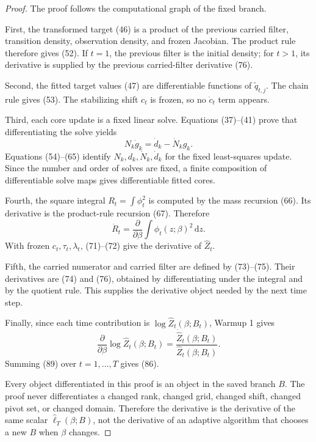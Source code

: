 \documentclass[11pt]{article}
\theoremstyle{remark}
\newcommand{\dd}{\,\mathrm d}
\newcommand{\widehatell}{\widehat\ell}
\begin{document}
\begin{proof}
The proof follows the computational graph of the fixed branch.

First, the transformed target (46) is a product of the previous carried filter,
transition density, observation density, and frozen Jacobian.  The product rule
therefore gives (52).  If \(t=1\), the previous filter is the initial density;
for \(t>1\), its derivative is supplied by the previous carried-filter
derivative (76).

Second, the fitted target values (47) are differentiable functions of
\(\widetilde q_{t,j}\).  The chain rule gives (53).  The stabilizing shift
\(c_t\) is frozen, so no \(\dot c_t\) term appears.

Third, each core update is a fixed linear solve.  Equations (37)--(41) prove
that differentiating the solve yields
\[
    N_k\dot g_k=\dot d_k-\dot N_k g_k.
    \tag{87}
\]
Equations (54)--(65) identify \(N_k,d_k,\dot N_k,\dot d_k\) for the fixed
least-squares update.  Since the number and order of solves are fixed, a finite
composition of differentiable solve maps gives differentiable fitted cores.

Fourth, the square integral \(R_t=\int\phi_t^2\) is computed by the mass
recursion (66).  Its derivative is the product-rule recursion (67).  Therefore
\[
    \dot R_t=\frac{\partial}{\partial\beta}
    \int\phi_t(z;\beta)^2\dd z.
    \tag{88}
\]
With frozen \(c_t,\tau_t,\lambda_t\), (71)--(72) give the derivative of
\(\widehat Z_t\).

Fifth, the carried numerator and carried filter are defined by (73)--(75).
Their derivatives are (74) and (76), obtained by differentiating under the
integral and by the quotient rule.  This supplies the derivative object needed
by the next time step.

Finally, since each time contribution is \(\log\widehat Z_t(\beta;B_t)\),
Warmup 1 gives
\[
    \frac{\partial}{\partial\beta}
    \log\widehat Z_t(\beta;B_t)
    =
    \frac{\dot{\widehat Z}_t(\beta;B_t)}
    {\widehat Z_t(\beta;B_t)}.
    \tag{89}
\]
Summing (89) over \(t=1,\ldots,T\) gives (86).

Every object differentiated in this proof is an object in the saved branch
\(B\).  The proof never differentiates a changed rank, changed grid, changed
shift, changed pivot set, or changed domain.  Therefore the derivative is the
derivative of the same scalar \(\widehatell_T(\beta;B)\), not the derivative of
an adaptive algorithm that chooses a new \(B\) when \(\beta\) changes.
\end{proof}
\end{document}
